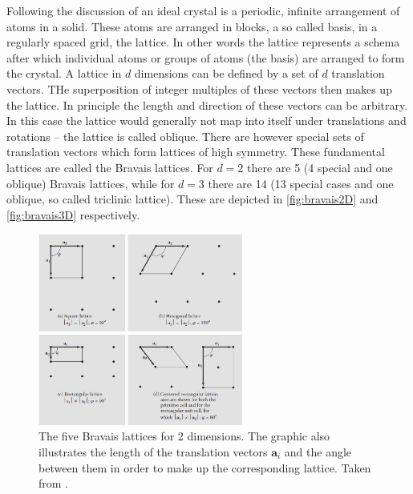 \documentclass[11pt,a4paper]{article}
\begin{document}
Following the discussion of \cite{kittelChapter1Crystal2005} an ideal crystal is a periodic, infinite arrangement of atoms in a solid. 
These atoms are arranged in blocks, a so called basis, in a regularly spaced grid, the lattice. 
In other words the lattice represents a schema after which individual atoms or groups of atoms (the basis) are arranged to form the crystal. 
A lattice in $d$ dimensions can be defined by a set of $d$ translation vectors. 
THe superposition of integer multiples of these vectors then makes up the lattice. 
In principle the length and direction of these vectors can be arbitrary. 
In this case the lattice would generally not map into itself under translations and rotations -- the lattice is called oblique. 
There are however special sets of translation vectors which form lattices of high symmetry. 
These fundamental lattices are called the Bravais lattices. 
For $d=2$ there are 5 (4 special and one oblique) Bravais lattices, while for $d=3$ there are 14 (13 special cases and one oblique, so called triclinic lattice). 
These are depicted in \autoref{fig:bravais2D} and \autoref{fig:bravais3D} respectively. 

\begin{figure}[htbp]
    \centering
    \includegraphics[width=0.6\textwidth]{images/Kittel_7.png}
    \caption{The five Bravais lattices for 2 dimensions. The graphic also illustrates the length of the translation vectors $\bm{a}_i$ and the angle between them in order to make up the corresponding lattice. Taken from \cite[Fig. 7]{kittelChapter1Crystal2005}.}
    \label{fig:bravais2D}
\end{figure}
\end{document}
